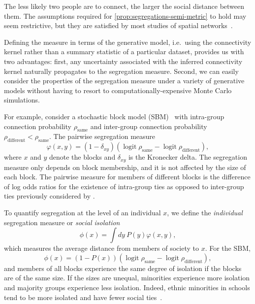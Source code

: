 \documentclass{scrartcl}
\DeclareMathOperator{\logit}{logit}
\begin{document}
The less likely two people are to connect, the larger the social distance between them. The assumptions required for \cref{prop:segregations-semi-metric} to hold may seem restrictive, but they are satisfied by most studies of spatial networks~\cite{Barnett2007,Lambiotte2008,Butts2012,Expert2011}.

Defining the measure in terms of the generative model, i.e.\ using the connectivity kernel rather than a summary statistic of a particular dataset, provides us with two advantages: first, any uncertainty associated with the inferred connectivity kernel naturally propagates to the segregation measure. Second, we can easily consider the properties of the segregation measure under a variety of generative models without having to resort to computationally-expensive Monte Carlo simulations.

For example, consider a stochastic block model (SBM)~\cite{Snijders2011} with intra-group connection probability $\rho_\mathrm{same}$ and inter-group connection probability $\rho_\mathrm{different}<\rho_\mathrm{same}$. The pairwise segregation measure
\[
    \varphi(x, y) = \left(1-\delta_{xy}\right)\left(\logit\rho_\mathrm{same}-\logit\rho_\mathrm{different}\right),
\]
where $x$ and $y$ denote the blocks and $\delta_{xy}$ is the Kronecker delta. The segregation measure only depends on block membership, and it is not affected by the size of each block. The pairwise measure for members of different blocks is the difference of log odds ratios for the existence of intra-group ties as opposed to inter-group ties previously considered by \textcite{Moody2001}.

To quantify segregation at the level of an individual $x$, we define the \emph{individual} segregation measure or \emph{social isolation}
\begin{equation}
    \phi(x) = \int dy \ P(y) \varphi(x, y),\label{eq:segregation-individual}
\end{equation}
which measures the average distance from members of society to $x$. For the SBM,
\begin{equation}
    \phi(x) = (1-P(x))\left(\logit\rho_\mathrm{same}-\logit\rho_\mathrm{different}\right),\label{eq:segregation-individual-sbm}
\end{equation}
and members of all blocks experience the same degree of isolation if the blocks are of the same size. If the sizes are unequal, minorities experience more isolation and majority groups experience less isolation. Indeed, ethnic minorities in schools tend to be more isolated and have fewer social ties~\cite{Currarini2009}.
\end{document}
